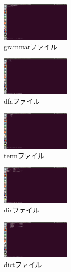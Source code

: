 \documentclass[12pt,oneside]{sotsuken_paper}
\begin{document}
\begin{figure}[htbp]
\begin{center}
\includegraphics[width=35mm]{img/grammar.png}
\caption{grammarファイル}
\label{fig:grammar}
\end{center}
\end{figure}


\begin{figure}[htbp]
\begin{center}
\includegraphics[width=35mm]{img/dfa.png}
\caption{dfaファイル}
\label{fig:dfa}
\end{center}
\end{figure}


\begin{figure}[htbp]
\begin{center}
\includegraphics[width=35mm]{img/term.png}
\caption{termファイル}
\label{fig:term}
\end{center}
\end{figure}


\begin{figure}[htbp]
\begin{center}
\includegraphics[width=35mm]{img/dic.png}
\caption{dicファイル}
\label{fig:dic}
\end{center}
\end{figure}


\begin{figure}[htbp]
\begin{center}
\includegraphics[width=35mm]{img/dict.png}
\caption{dictファイル}
\label{fig:dict}
\end{center}
\end{figure}
\end{document}

